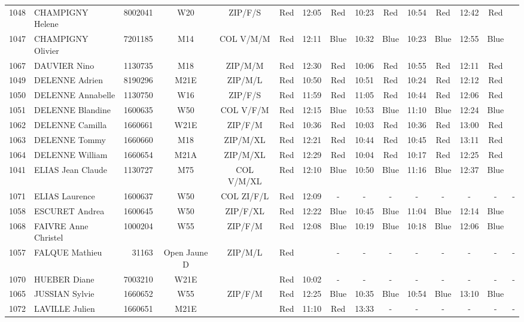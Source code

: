 \documentclass{report}
\begin{document}
\begin{longtable}{|c|l|r|c|c|*{5}{cc|}}
    1048 & CHAMPIGNY Helene & 8002041 & W20 & ZIP/F/S & Red & 12:05 & Red & 10:23 & Red & 10:54 & Red & 12:42 & Red &  \\
    1047 & CHAMPIGNY Olivier & 7201185 & M14 & COL V/M/M & Red & 12:11 & Blue & 10:32 & Blue & 10:23 & Blue & 12:55 & Blue &  \\
    1067 & DAUVIER Nino & 1130735 & M18 & ZIP/M/M & Red & 12:30 & Red & 10:06 & Red & 10:55 & Red & 12:11 & Red &  \\
    1049 & DELENNE Adrien & 8190296 & M21E & ZIP/M/L & Red & 10:50 & Red & 10:51 & Red & 10:24 & Red & 12:12 & Red &  \\
    1050 & DELENNE Annabelle & 1130750 & W16 & ZIP/F/S & Red & 11:59 & Red & 11:05 & Red & 10:44 & Red & 12:06 & Red &  \\
    1051 & DELENNE Blandine & 1600635 & W50 & COL V/F/M & Red & 12:15 & Blue & 10:53 & Blue & 11:10 & Blue & 12:24 & Blue &  \\
    1062 & DELENNE Camilla & 1660661 & W21E & ZIP/F/M & Red & 10:36 & Red & 10:03 & Red & 10:36 & Red & 13:00 & Red &  \\
    1063 & DELENNE Tommy & 1660660 & M18 & ZIP/M/XL & Red & 12:21 & Red & 10:44 & Red & 10:45 & Red & 13:11 & Red &  \\
    1064 & DELENNE William & 1660654 & M21A & ZIP/M/XL & Red & 12:29 & Red & 10:04 & Red & 10:17 & Red & 12:25 & Red &  \\
    1041 & ELIAS Jean Claude & 1130727 & M75 & COL V/M/XL & Red & 12:10 & Blue & 10:50 & Blue & 11:16 & Blue & 12:37 & Blue &  \\
    1071 & ELIAS Laurence & 1600637 & W50 & COL ZI/F/L & Red & 12:09 & - &  - & - &  - & - &  - & - &  -\\
    1058 & ESCURET Andrea & 1600645 & W50 & ZIP/F/XL & Red & 12:22 & Blue & 10:45 & Blue & 11:04 & Blue & 12:14 & Blue &  \\
    1068 & FAIVRE Anne Christel & 1000204 & W55 & ZIP/F/M & Red & 12:08 & Blue & 10:19 & Blue & 10:18 & Blue & 12:06 & Blue &  \\
    1057 & FALQUE Mathieu & 31163 & Open Jaune D & ZIP/M/L & Red &   & - &  - & - &  - & - &  - & - &  -\\
    1070 & HUEBER Diane & 7003210 & W21E &   & Red & 10:02 & - &  - & - &  - & - &  - & - &  -\\
    1065 & JUSSIAN Sylvie & 1660652 & W55 & ZIP/F/M & Red & 12:25 & Blue & 10:35 & Blue & 10:54 & Blue & 13:10 & Blue &  \\
    1072 & LAVILLE Julien & 1660651 & M21E &   & Red & 11:10 & Red & 13:33 & - &  - & - &  - & - &  -\\

\end{longtable}
\end{document}
